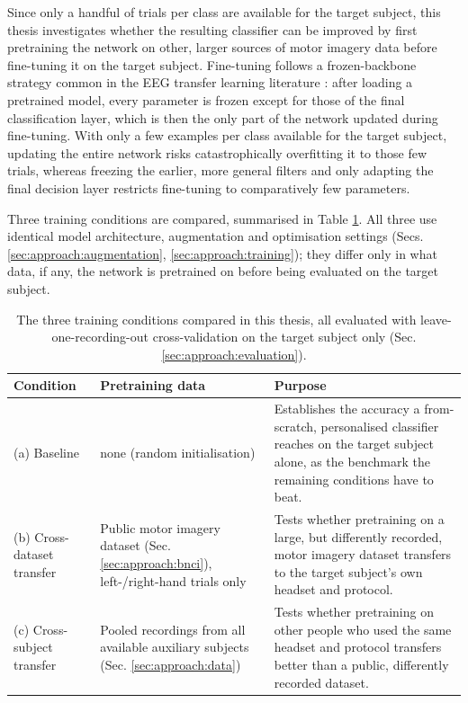 Since only a handful of trials per class are available for the target subject, this thesis investigates whether the resulting classifier can be improved by first pretraining the network on other, larger sources of motor imagery data before fine-tuning it on the target subject. Fine-tuning follows a frozen-backbone strategy common in the EEG transfer learning literature \cite{wu-2020}: after loading a pretrained model, every parameter is frozen except for those of the final classification layer, which is then the only part of the network updated during fine-tuning. With only a few examples per class available for the target subject, updating the entire network risks catastrophically overfitting it to those few trials, whereas freezing the earlier, more general filters and only adapting the final decision layer restricts fine-tuning to comparatively few parameters.

Three training conditions are compared, summarised in Table \ref{tab:approach:arms}. All three use identical model architecture, augmentation and optimisation settings (Secs. \ref{sec:approach:augmentation}, \ref{sec:approach:training}); they differ only in what data, if any, the network is pretrained on before being evaluated on the target subject.

\begin{table}[H]
    \centering
    \small
    \begin{tabular}{|p{2.7cm}|p{3.6cm}|p{6.2cm}|}
        \hline
        \textbf{Condition} & \textbf{Pretraining data} & \textbf{Purpose} \\
        \hline
        (a) Baseline & none (random initialisation) & Establishes the accuracy a from-scratch, personalised classifier reaches on the target subject alone, as the benchmark the remaining conditions have to beat. \\
        \hline
        (b) Cross-dataset transfer & Public motor imagery dataset (Sec. \ref{sec:approach:bnci}), left-/right-hand trials only & Tests whether pretraining on a large, but differently recorded, motor imagery dataset transfers to the target subject's own headset and protocol. \\
        \hline
        (c) Cross-subject transfer & Pooled recordings from all available auxiliary subjects (Sec. \ref{sec:approach:data}) & Tests whether pretraining on other people who used the same headset and protocol transfers better than a public, differently recorded dataset. \\
        \hline
    \end{tabular}
    \caption{The three training conditions compared in this thesis, all evaluated with leave-one-recording-out cross-validation on the target subject only (Sec. \ref{sec:approach:evaluation}).}
    \label{tab:approach:arms}
\end{table}

